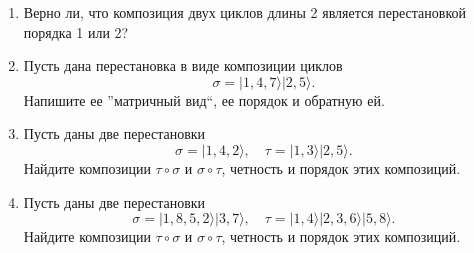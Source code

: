 \begin{enumerate}
    \item Верно ли, что композиция двух циклов длины 2 является перестановкой порядка 1 или 2?
    \item Пусть дана перестановка в виде композиции циклов  \[
            \sigma = | 1, 4, 7 \rangle |2, 5 \rangle
        .\]  
        Напишите ее ''матричный вид``, ее порядок и обратную ей.
    \item Пусть даны две перестановки \[
            \sigma = | 1, 4, 2 \rangle 
            , \quad
            \tau = | 1, 3 \rangle | 2, 5 \rangle
        .\]
        Найдите композиции $\tau \circ \sigma$ и $\sigma \circ \tau$, четность и порядок этих композиций.
    \item Пусть даны две перестановки \[
            \sigma = | 1, 8, 5, 2 \rangle | 3, 7 \rangle
            , \quad
            \tau = | 1, 4\rangle |2,  3, 6 \rangle | 5, 8 \rangle
            .
        \]
        Найдите композиции $\tau \circ \sigma$ и $\sigma \circ \tau$, четность и порядок этих композиций.

\end{enumerate}
